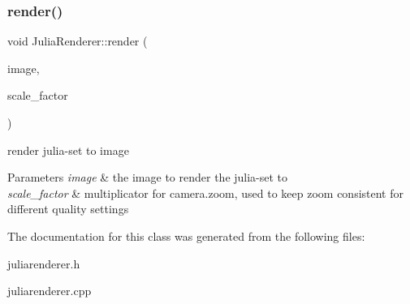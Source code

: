 \subsubsection{\texorpdfstring{render()}{render()}}
{\footnotesize\ttfamily void Julia\+Renderer\+::render (\begin{DoxyParamCaption}\item[{Q\+Image \&}]{image,  }\item[{double}]{scale\+\_\+factor }\end{DoxyParamCaption})}



render julia-\/set to image 


\begin{DoxyParams}{Parameters}
{\em image} & the image to render the julia-\/set to \\
\hline
{\em scale\+\_\+factor} & multiplicator for camera.\+zoom, used to keep zoom consistent for different quality settings \\
\hline
\end{DoxyParams}


The documentation for this class was generated from the following files\+:\begin{DoxyCompactItemize}
\item 
juliarenderer.\+h\item 
juliarenderer.\+cpp\end{DoxyCompactItemize}
